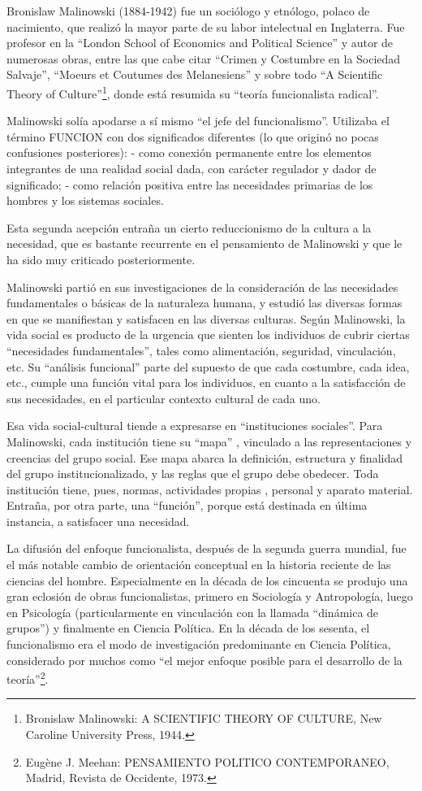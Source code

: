 \documentclass[
]{book}
\begin{document}
Bronislaw Malinowski (1884-1942) fue un sociólogo y etnólogo, polaco de nacimiento, que realizó la mayor parte de su labor intelectual en Inglaterra. Fue profesor en la ``London School of Economics and Political Science'' y autor de numerosas obras, entre las que cabe citar ``Crimen y Costumbre en la Sociedad Salvaje'', ``Moeurs et Coutumes des Melanesiens'' y sobre todo ``A Scientific Theory of Culture''\footnote{Bronislaw Malinowski: A SCIENTIFIC THEORY OF CULTURE, New Caroline University Press, 1944.}, donde está resumida su ``teoría funcionalista radical''.

Malinowski solía apodarse a sí mismo ``el jefe del funcionalismo''. Utilizaba el término FUNCION con dos significados diferentes (lo que originó no pocas confusiones posteriores): - como conexión permanente entre los elementos integrantes de una realidad social dada, con carácter regulador y dador de significado; - como relación positiva entre las necesidades primarias de los hombres y los sistemas sociales.

Esta segunda acepción entraña un cierto reduccionismo de la cultura a la necesidad, que es bastante recurrente en el pensamiento de Malinowski y que le ha sido muy criticado posteriormente.

Malinowski partió en sus investigaciones de la consideración de las necesidades fundamentales o básicas de la naturaleza humana, y estudió las diversas formas en que se manifiestan y satisfacen en las diversas culturas. Según Malinowski, la vida social es producto de la urgencia que sienten los individuos de cubrir ciertas ``necesidades fundamentales'', tales como alimentación, seguridad, vinculación, etc. Su ``análisis funcional'' parte del supuesto de que cada costumbre, cada idea, etc., cumple una función vital para los individuos, en cuanto a la satisfacción de sus necesidades, en el particular contexto cultural de cada uno.

Esa vida social-cultural tiende a expresarse en ``instituciones sociales''. Para Malinowski, cada institución tiene su ``mapa'' , vinculado a las representaciones y creencias del grupo social. Ese mapa abarca la definición, estructura y finalidad del grupo institucionalizado, y las reglas que el grupo debe obedecer. Toda institución tiene, pues, normas, actividades propias , personal y aparato material. Entraña, por otra parte, una ``función'', porque está destinada en última instancia, a satisfacer una necesidad.

La difusión del enfoque funcionalista, después de la segunda guerra mundial, fue el más notable cambio de orientación conceptual en la historia reciente de las ciencias del hombre. Especialmente en la década de los cincuenta se produjo una gran eclosión de obras funcionalistas, primero en Sociología y Antropología, luego en Psicología (particularmente en vinculación con la llamada ``dinámica de grupos'') y finalmente en Ciencia Política. En la década de los sesenta, el funcionalismo era el modo de investigación predominante en Ciencia Política, considerado por muchos como ``el mejor enfoque posible para el desarrollo de la teoría''\footnote{Eugène J. Meehan: PENSAMIENTO POLITICO CONTEMPORANEO, Madrid, Revista de Occidente, 1973.}.
\end{document}
